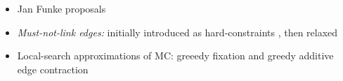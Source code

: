 \begin{itemize}
\begin{itemize}
\begin{itemize}
\item Jan Funke proposals
\item \textit{Must-not-link edges:} initially introduced as hard-constraints \cite{malmberg2011generalized}, then relaxed \cite{wolf2018mutex,levinkov2017comparative}
\item Local-search approximations of MC: greeedy fixation and greedy additive edge contraction \cite{levinkov2017comparative}
\end{itemize}
\end{itemize}

\end{itemize}

